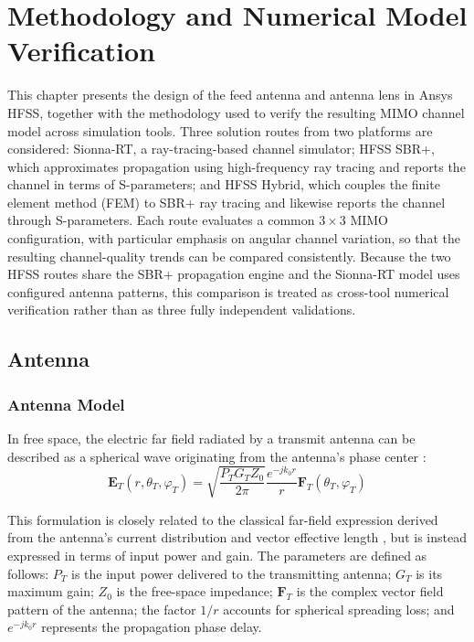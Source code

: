 \chapter{Methodology and Numerical Model Verification}


This chapter presents the design of the feed antenna and antenna lens in Ansys HFSS, together with the methodology used to verify the resulting MIMO channel model across simulation tools. Three solution routes from two platforms are considered: Sionna-RT, a ray-tracing-based channel simulator; HFSS SBR+, which approximates propagation using high-frequency ray tracing and reports the channel in terms of S-parameters; and HFSS Hybrid, which couples the finite element method (FEM) to SBR+ ray tracing and likewise reports the channel through S-parameters. Each route evaluates a common $3\times3$ MIMO configuration, with particular emphasis on angular channel variation, so that the resulting channel-quality trends can be compared consistently. Because the two HFSS routes share the SBR+ propagation engine and the Sionna-RT model uses configured antenna patterns, this comparison is treated as cross-tool numerical verification rather than as three fully independent validations.

\section{Antenna}
\subsection{Antenna Model}
In free space, the electric far field radiated by a transmit antenna can be described as a spherical wave originating from the antenna's phase center \cite{NVIDIACorporation2026}:
\begin{equation}
\mathbf{E}_T(r, \theta_T, \varphi_T) = \sqrt{\frac{P_T G_T Z_0}{2\pi}} \frac{e^{-jk_0 r} }{r}\mathbf{F}_T(\theta_T, \varphi_T)
\end{equation}

This formulation is closely related to the classical far-field expression derived from the antenna's current distribution and vector effective length \cite{ConstantineABalanis2016}, but is instead expressed in terms of input power and gain. The parameters are defined as follows: $P_T$ is the input power delivered to the transmitting antenna; $G_T$ is its maximum gain; $Z_0$ is the free-space impedance; $\mathbf{F}_T$ is the complex vector field pattern of the antenna; the factor $1/r$ accounts for spherical spreading loss; and $e^{-jk_0 r}$ represents the propagation phase delay.

